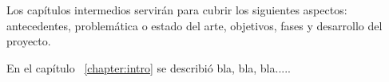 
Los capítulos intermedios servirán para cubrir los siguientes aspectos:
antecedentes, problemática o estado del arte, objetivos, fases y desarrollo del proyecto.

En el capítulo ~\ref{chapter:intro} se describió bla, bla, bla.....
